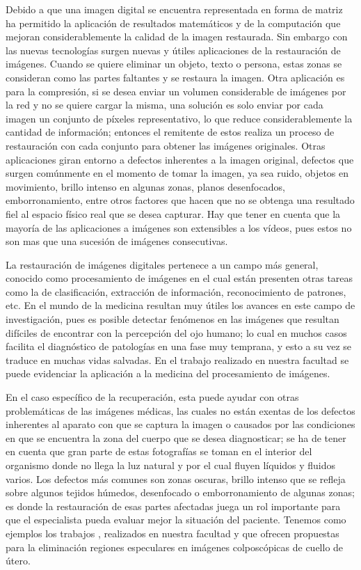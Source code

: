 Debido a que una imagen digital se encuentra representada en forma de matriz ha permitido la aplicaci\'on de resultados matem\'aticos y de la computaci\'on que mejoran considerablemente la calidad de la imagen restaurada. Sin embargo con las nuevas tecnolog\'ias surgen nuevas y \'utiles aplicaciones de la restauraci\'on de im\'agenes. Cuando se quiere eliminar un objeto, texto o persona, estas zonas se consideran como las partes faltantes y se restaura la imagen. Otra aplicaci\'on es para la compresi\'on, si se desea enviar un volumen considerable de imágenes por la red y no se quiere cargar la misma, una solución es solo enviar por cada imagen un conjunto de p\'ixeles representativo, lo que reduce considerablemente la cantidad de informaci\'on; entonces el remitente de estos realiza un proceso de restauraci\'on con cada conjunto para obtener las imágenes originales. Otras aplicaciones giran entorno a defectos inherentes a la imagen original, defectos que surgen comúnmente en el momento de tomar la imagen, ya sea ruido, objetos en movimiento, brillo intenso en algunas zonas, planos desenfocados, emborronamiento, entre otros factores que hacen que no se obtenga una resultado fiel al espacio físico real que se desea capturar. Hay que tener en cuenta que la mayor\'ia de las aplicaciones a im\'agenes son extensibles a los vídeos, pues estos no son mas que una sucesión de imágenes consecutivas.

La restauraci\'on de im\'agenes digitales pertenece a un campo m\'as general, conocido como procesamiento de im\'agenes en el cual est\'an presenten otras tareas como la de clasificaci\'on, extracci\'on de informaci\'on, reconocimiento de patrones, etc. En el mundo de la medicina resultan muy \'utiles los avances en este campo de investigaci\'on, pues es posible detectar fen\'omenos en las im\'agenes que resultan difíciles de encontrar con la percepción del ojo humano; lo cual en muchos casos facilita el diagn\'ostico de patologías en una fase muy temprana, y esto a su vez se traduce en muchas vidas salvadas. En el trabajo \cite{afals2016tesis} realizado en nuestra facultad se puede evidenciar la aplicaci\'on a la medicina del procesamiento de im\'agenes.

En el caso espec\'ifico de la recuperaci\'on, esta puede ayudar con otras problemáticas de las im\'agenes m\'edicas, las cuales no est\'an exentas de los defectos inherentes al aparato con que se captura la imagen o causados por las condiciones en que se encuentra la zona del cuerpo que se desea diagnosticar; se ha de tener en cuenta que gran parte de estas fotograf\'ias se toman en el interior del organismo donde no llega la luz natural y por el cual fluyen l\'iquidos y fluidos varios. Los defectos m\'as comunes son zonas oscuras, brillo intenso que se refleja sobre algunos tejidos h\'umedos, desenfocado o emborronamiento de algunas zonas; es donde la restauraci\'on de esas partes afectadas juega un rol importante para que el especialista pueda evaluar mejor la situaci\'on del paciente. Tenemos como ejemplos los trabajos \cite{dgomez2018tesis,apalmer2015tesis}, realizados en nuestra facultad y que ofrecen propuestas para la eliminaci\'on regiones especulares en imágenes colposcópicas de cuello de útero.

